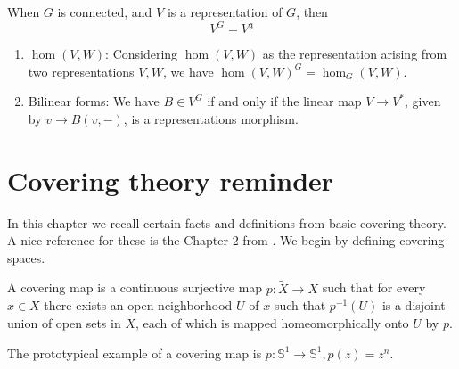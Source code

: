 \documentclass{report}
\begin{document}
\begin{remark}
    When $G$ is connected, and $V$ is a representation of $G$, then
    \[
    V^G = V^{\mathfrak g}
    \]
\end{remark}

\begin{example}
    \begin{enumerate}[label = (\roman*)]
        \item $\hom(V, W)$: Considering $\hom(V,W)$ as the representation arising from two representations $V, W$, we have $\hom(V, W)^G = \hom_G(V, W)$.
        \item Bilinear forms: We have $B \in V^G$ if and only if the linear map $V \to V^*$, given by $v \to B(v, -)$, is a representations morphism.
    \end{enumerate}
\end{example}

\appendix

\chapter{Covering theory reminder}
In this chapter we recall certain facts and definitions from basic covering theory.
A nice reference for these is the Chapter 2 from \cite{hatcher2002topology}.
We begin by defining covering spaces.
\begin{definition}
    A covering map is a continuous surjective map $p: \tilde X \to X$ such that for every $x \in X$ there exists an open neighborhood $U$ of $x$ such that $p^{-1}(U)$ is a disjoint union of open sets in $\tilde X$, each of which is mapped homeomorphically onto $U$ by $p$.
\end{definition}
The prototypical example of a covering map is $p: \mathbb S^1 \to \mathbb S^1, p(z) = z^n$.
\end{document}
